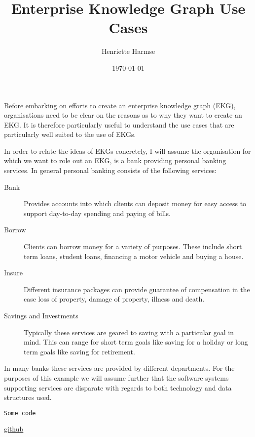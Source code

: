 \documentclass{amsart}
\title{Enterprise Knowledge Graph Use Cases}
\author{Henriette Harmse}
\date{\today}
\begin{document}
  \maketitle
  
  Before embarking on efforts to create an enterprise knowledge graph (EKG), organisations need to be clear on the reasons as to why they want to create an EKG. It is therefore particularly useful to understand the use cases that are particularly well suited to the use of EKGs. 

  In order to relate the ideas of EKGs concretely, I will assume the organisation for which we want to role out an EKG, is a bank providing personal banking services. In general personal banking consists of the following services:
  \begin{description}
  	\item[Bank] Provides accounts into which clients can deposit money for easy access to support day-to-day spending and paying of bills. 
  	\item[Borrow] Clients can borrow money for a variety of purposes. These include short term loans, student loans, financing a motor vehicle and buying a house.
  	\item[Insure] Different insurance packages can provide guarantee of compensation in the case loss of property, damage of property, illness and death.  
  	\item[Savings and Investments] Typically these services are geared to saving with a particular goal in mind. This can range for short term goals like saving for a holiday or long term goals like saving for retirement.
  \end{description}
  
   In many banks these services are provided by different departments. For the purposes of this example we will assume further that the software systems supporting services are disparate with regards to both technology and data structures used.  



  
  
  \cite{Aameri2015}

\begin{small}
\begin{verbatim} 
Some code
\end{verbatim}
\end{small}

\href{http://}{github}
  
  
  
 
\end{document}
